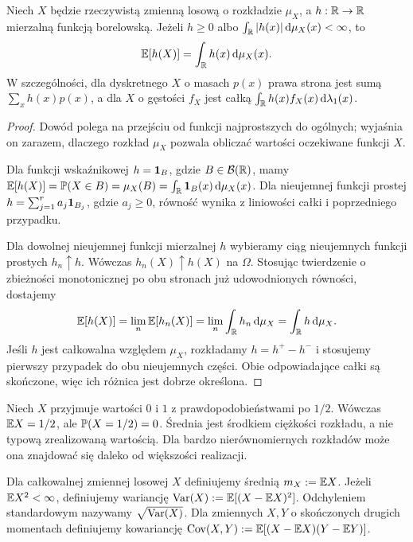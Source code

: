 \begin{twierdzenie}
Niech $X$ będzie rzeczywistą zmienną losową o rozkładzie $\mu_X$,
a $h:\mathbb{R}\to\mathbb{R}$ mierzalną funkcją borelowską.
Jeżeli $h\geq0$ albo $\int_{\mathbb{R}}|h(x)|\,\mathrm{d}\mu_X(x)<\infty$, to
\begin{equation}\label{eq:lotus}
\mathbb{E}[h(X)]=\int_{\mathbb{R}} h(x)\,\mathrm{d}\mu_X(x).
\end{equation}
W szczególności, dla dyskretnego $X$ o masach $p(x)$ prawa strona
jest sumą $\sum_xh(x)p(x)$, a dla $X$ o gęstości $f_X$
jest całką $\int_{\mathbb{R}} h(x)f_X(x)\,\mathrm{d}\lambda_1(x)$.
\end{twierdzenie}
\begin{proof}
Dowód polega na przejściu od funkcji najprostszych
do ogólnych; wyjaśnia on zarazem, dlaczego rozkład
$\mu_X$ pozwala obliczać wartości oczekiwane funkcji $X$.

Dla funkcji wskaźnikowej $h=\mathbf{1}_{B}$, gdzie
$B\in\mathcal B(\mathbb{R})$, mamy
$\mathbb{E}[h(X)]=\mathbb{P}(X\in B)=\mu_X(B)
=\int_{\mathbb{R}}\mathbf{1}_{B}(x)\,\mathrm{d}\mu_X(x)$.
Dla nieujemnej funkcji prostej
$h=\sum_{j=1}^r a_j\mathbf{1}_{B_j}$, gdzie $a_j\geq0$,
równość wynika z liniowości całki i poprzedniego przypadku.

Dla dowolnej nieujemnej funkcji mierzalnej $h$
wybieramy ciąg nieujemnych funkcji prostych $h_n\uparrow h$.
Wówczas $h_n(X)\uparrow h(X)$ na $\Omega$.
Stosując twierdzenie o zbieżności monotonicznej
po obu stronach już udowodnionych równości, dostajemy
\[
\mathbb{E}[h(X)]=\lim_n\mathbb{E}[h_n(X)]
=\lim_n\int_{\mathbb{R}} h_n\,\mathrm{d}\mu_X
=\int_{\mathbb{R}} h\,\mathrm{d}\mu_X.
\]
Jeśli $h$ jest całkowalna względem $\mu_X$,
rozkładamy $h=h^+-h^-$ i stosujemy pierwszy przypadek
do obu nieujemnych części. Obie odpowiadające całki
są skończone, więc ich różnica jest dobrze określona.
\end{proof}


\begin{przyklad}
Niech $X$ przyjmuje wartości $0$ i $1$ z prawdopodobieństwami
po $1/2$. Wówczas $\mathbb{E} X=1/2$, ale $\mathbb{P}(X=1/2)=0$.
Średnia jest środkiem ciężkości rozkładu, a nie typową
zrealizowaną wartością. Dla bardzo nierównomiernych rozkładów
może ona znajdować się daleko od większości realizacji.
\end{przyklad}

\begin{definicja}
Dla całkowalnej zmiennej losowej $X$ definiujemy średnią
$m_X:=\mathbb{E} X$. Jeżeli $\mathbb{E} X^2<\infty$, definiujemy
wariancję $\operatorname{Var}(X):=\mathbb{E}[(X-\mathbb{E} X)^2]$.
Odchyleniem standardowym nazywamy $\sqrt{\operatorname{Var}(X)}$.
Dla zmiennych $X,Y$ o skończonych drugich momentach definiujemy
kowariancję $\operatorname{Cov}(X,Y):=\mathbb{E}[(X-\mathbb{E} X)(Y-\mathbb{E} Y)]$.
\end{definicja}

